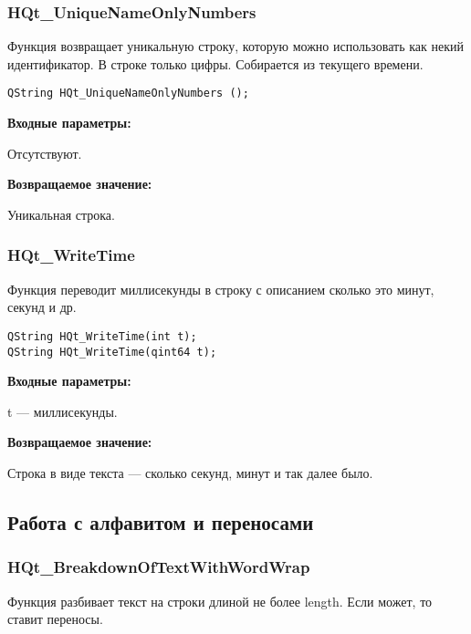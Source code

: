 \documentclass[a4paper,12pt]{article}
\begin{document}
\subsubsection{HQt\_UniqueNameOnlyNumbers}\label{HQt_UniqueNameOnlyNumbers}

Функция возвращает уникальную строку, которую можно использовать как некий идентификатор. В строке только цифры. Собирается из текущего времени.


\begin{lstlisting}[label=code_syntax_HQt_UniqueNameOnlyNumbers,caption=Синтаксис]
QString HQt_UniqueNameOnlyNumbers ();
\end{lstlisting}

\textbf{Входные параметры:}

Отсутствуют.

\textbf{Возвращаемое значение:}

Уникальная строка.


\subsubsection{HQt\_WriteTime}\label{HQt_WriteTime}

Функция переводит миллисекунды в строку с описанием сколько это минут, секунд и др.


\begin{lstlisting}[label=code_syntax_HQt_WriteTime,caption=Синтаксис]
QString HQt_WriteTime(int t);
QString HQt_WriteTime(qint64 t);
\end{lstlisting}

\textbf{Входные параметры:}

t --- миллисекунды.

\textbf{Возвращаемое значение:}

Строка в виде текста --- сколько секунд, минут и так далее было.


\subsection{Работа с алфавитом и переносами}

\subsubsection{HQt\_BreakdownOfTextWithWordWrap}\label{HQt_BreakdownOfTextWithWordWrap}

Функция разбивает текст на строки длиной не более length. Если может, то ставит переносы.
\end{document}
